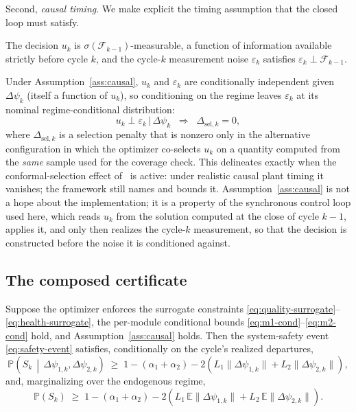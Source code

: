 Second, \emph{causal timing}. We make explicit the timing assumption that the
closed loop must satisfy.
\begin{assumption}
\label{ass:causal}
The decision $u_k$ is $\sigma(\mathcal{F}_{k-1})$-measurable, a function of
information available strictly before cycle $k$, and the cycle-$k$ measurement
noise $\varepsilon_k$ satisfies $\varepsilon_k \perp \mathcal{F}_{k-1}$.
\end{assumption}
Under Assumption~\ref{ass:causal}, $u_k$ and $\varepsilon_k$ are conditionally
independent given $\Delta\psi_k$ (itself a function of $u_k$), so conditioning on
the regime leaves $\varepsilon_k$ at its nominal regime-conditional distribution:
\begin{equation}
u_k \perp \varepsilon_k \,\big|\, \Delta\psi_k \;\;\Longrightarrow\;\; \Delta_{\mathrm{sel},k} = 0,
\label{eq:no-selection}
\end{equation}
where $\Delta_{\mathrm{sel},k}$ is a selection penalty that is nonzero only in the
alternative configuration in which the optimizer co-selects $u_k$ on a quantity
computed from the \emph{same} sample used for the coverage check. This delineates
exactly when the conformal-selection effect of~\citet{busico_m3} is active: under
realistic causal plant timing it vanishes; the framework still names and bounds
it. Assumption~\ref{ass:causal} is not a hope about the implementation; it is a
property of the synchronous control loop used here, which reads $u_k$ from the
solution computed at the close of cycle $k-1$, applies it, and only then realizes
the cycle-$k$ measurement, so that the decision is constructed before the noise it
is conditioned against.

\subsection{The composed certificate}
\label{sec:theorem}

\begin{theorem}
\label{thm:composed}
Suppose the optimizer enforces the surrogate constraints
\eqref{eq:quality-surrogate}--\eqref{eq:health-surrogate}, the per-module
conditional bounds \eqref{eq:m1-cond}--\eqref{eq:m2-cond} hold, and
Assumption~\ref{ass:causal} holds. Then the system-safety event
\eqref{eq:safety-event} satisfies, conditionally on the cycle's realized
departures,
\begin{equation}
\mathbb{P}\!\left(S_k \,\middle|\, \Delta\psi_{1,k}, \Delta\psi_{2,k}\right)
\;\ge\; 1 - (\alpha_1 + \alpha_2)
       - 2\!\left(L_1\|\Delta\psi_{1,k}\| + L_2\|\Delta\psi_{2,k}\|\right),
\label{eq:certificate-cond}
\end{equation}
and, marginalizing over the endogenous regime,
\begin{equation}
\mathbb{P}(S_k) \;\ge\; 1 - (\alpha_1 + \alpha_2)
       - 2\!\left(L_1\,\mathbb{E}\|\Delta\psi_{1,k}\| + L_2\,\mathbb{E}\|\Delta\psi_{2,k}\|\right).
\label{eq:certificate-marg}
\end{equation}
\end{theorem}

